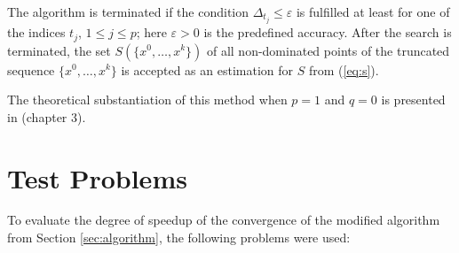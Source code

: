 \documentclass{llncs}
\begin{document}
The algorithm is terminated if the condition \(\Delta_{t_j}\leqslant \varepsilon\) is fulfilled at
least for one of the indices \(t_j\), \(1\leqslant j\leqslant p\); here \(\varepsilon >0\) is the
predefined accuracy.
After the search is terminated, the set \(S(\{x^0,\dots ,x^k\})\) of all
non-dominated points of the truncated sequence \(\{x^0,\dots ,x^k\}\) is accepted as an
estimation for \(S\) from (\ref{eq:s}).

The theoretical substantiation of this method when \(p=1\) and \(q=0\) is presented in
\cite{strOptBook}(chapter 3).
\section{Test Problems}
\label{sec:test_problems}
To evaluate the degree of speedup of the convergence of the modified algorithm from
Section \ref{sec:algorithm}, the following problems were used:
\end{document}
